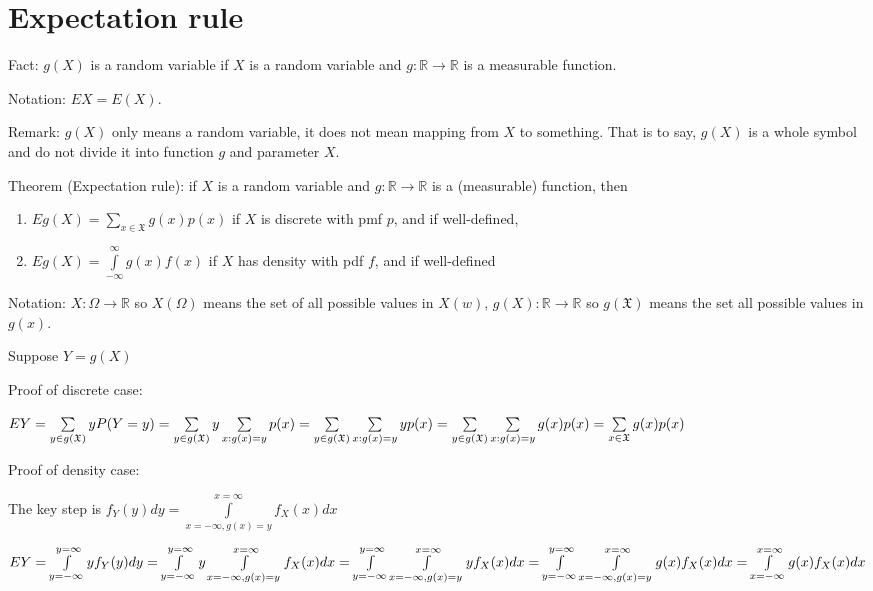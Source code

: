 \documentclass[12pt]{article}
\begin{document}
\section{Expectation rule}

Fact: $g(X)$ is a random variable if $X$ is a random variable and $g:\mathbb{R}\rightarrow\mathbb{R}$ is a measurable function.

Notation: $EX=E(X)$.

Remark: $g(X)$ only means a random variable, it does not mean mapping from $X$ to something. That is to say,
$g(X)$ is a whole symbol and do not divide it into function $g$ and parameter $X$.

Theorem (Expectation rule): if $X$ is a random variable and $g:\mathbb{R}\rightarrow\mathbb{R}$ is a (measurable) function,
then
\begin{enumerate}
    \item $Eg(X)=\sum\limits_{x\in\mathfrak{X}}g(x)p(x)$ if $X$ is discrete with pmf $p$, and if well-defined,
    \item $Eg(X)=\int\limits_{-\infty}^{\infty}g(x)f(x)$ if $X$ has density with pdf $f$, and if well-defined
\end{enumerate}

\bigbreak

Notation: $X:\Omega\rightarrow\mathbb{R}$ so $X(\Omega)$ means the set of all possible values in $X(w)$,
$g(X):\mathbb{R}\rightarrow\mathbb{R}$ so $g(\mathfrak{X})$ means the set all possible values in $g(x)$.

\bigbreak
Suppose $Y=g(X)$

Proof of discrete case:

$EY=\sum\limits_{y\in g(\mathfrak{X})} y P(Y=y) \\ 
= \sum\limits_{y\in g(\mathfrak{X})} y \sum\limits_{x:g(x)=y} p(x) \\ 
= \sum\limits_{y\in g(\mathfrak{X})}\sum\limits_{x:g(x)=y} y p(x) \\
= \sum\limits_{y\in g(\mathfrak{X})} \sum\limits_{x:g(x)=y} g(x) p(x) \\
= \sum\limits_{x\in \mathfrak{X}} g(x)p(x)$

\bigbreak
Proof of density case:

The key step is $f_Y(y) dy = \int\limits_{x=-\infty,g(x)=y}^{x=\infty} f_X(x) dx$

$EY = \int\limits_{y=-\infty}^{y=\infty} y f_{Y}(y) dy \\ 
= \int\limits_{y=-\infty}^{y=\infty} y \int\limits_{x=-\infty,g(x)=y}^{x=\infty} f_X(x)dx \\ 
= \int\limits_{y=-\infty}^{y=\infty} \int\limits_{x=-\infty,g(x)=y}^{x=\infty} y f_X(x)dx \\
= \int\limits_{y=-\infty}^{y=\infty} \int\limits_{x=-\infty,g(x)=y}^{x=\infty} g(x) f_X(x)dx \\
= \int\limits_{x=-\infty}^{x=\infty} g(x) f_X(x)dx$
\end{document}

